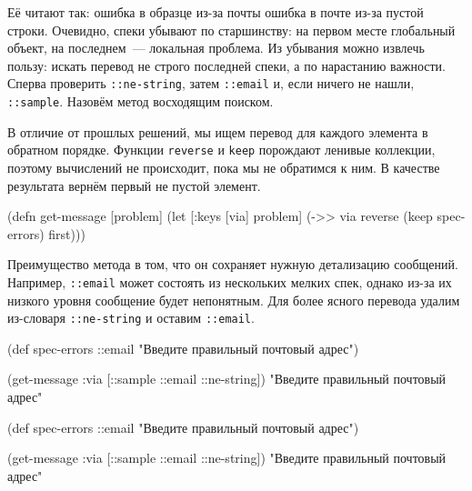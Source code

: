 Её читают так: ошибка в образце из-за почты \arr{} ошибка в почте из-за
пустой строки. Очевидно, спеки убывают по старшинству: на первом месте
глобальный объект, на последнем~--- локальная проблема. Из убывания можно
извлечь пользу: искать перевод не строго последней спеки, а по нарастанию
важности. Сперва проверить \verb|::ne-string|, затем \verb|::email| и, если
ничего не нашли, \verb|::sample|. Назовём метод восходящим поиском.


В отличие от прошлых решений, мы ищем перевод для каждого элемента в обратном
порядке. Функции \verb|reverse| и \verb|keep| порождают ленивые коллекции,
поэтому вычислений не происходит, пока мы не обратимся к ним. В качестве
результата вернём первый не пустой элемент.

\begin{english}
  \begin{clojure}
(defn get-message
  [problem]
  (let [{:keys [via]} problem]
    (->> via
         reverse
         (keep spec-errors)
         first)))
  \end{clojure}
\end{english}

Преимущество метода в том, что он сохраняет нужную детализацию
сообщений. Например, \verb|::email| может состоять из нескольких мелких спек,
однако из-за их низкого уровня сообщение будет непонятным. Для более ясного
перевода удалим из-словаря \verb|::ne-string| и оставим \verb|::email|.

\ifx\DEVICETYPE\MOBILE

  \begin{clojure}
(def spec-errors
  {::email
   "Введите правильный почтовый адрес"})

(get-message
  {:via [::sample ::email ::ne-string]})
"Введите правильный почтовый адрес"
  \end{clojure}

\else

  \begin{clojure}
(def spec-errors
  {::email "Введите правильный почтовый адрес"})

(get-message {:via [::sample ::email ::ne-string]})
"Введите правильный почтовый адрес"
  \end{clojure}

